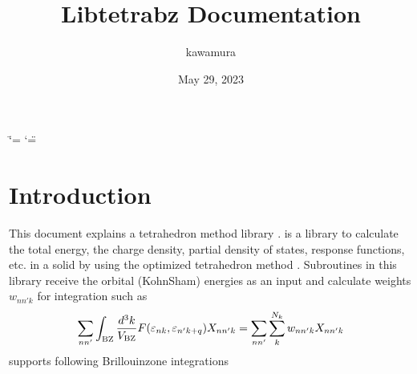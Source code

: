 \documentclass[letterpaper,10pt,pdftex,openany,english]{sphinxmanual}
\title{Libtetrabz Documentation}
\date{May 29, 2023}
\author{kawamura}
\begin{document}
\ifdefined\shorthandoff
  \ifnum\catcode`\=\string=\active\shorthandoff{=}\fi
  \ifnum\catcode`\"=\active{}\fi
\fi

\pagestyle{empty}
\sphinxmaketitle
\pagestyle{plain}
\sphinxtableofcontents
\pagestyle{normal}
\label{\detokenize{index::doc}}


\sphinxstepscope


\chapter{Introduction}
\label{\detokenize{overview:introduction}}\label{\detokenize{overview::doc}}
\sphinxAtStartPar
This document explains a tetrahedron method library .
 is a library to calculate the total energy, the charge
density, partial density of states, response functions, etc. in a solid
by using the optimized tetrahedron method {\hyperref[\detokenize{ref:ref}]{}}.
Subroutines in this library receive the orbital (Kohn\sphinxhyphen{}Sham) energies as an input and
calculate weights \(w_{n n' k}\) for integration such as
\begin{equation*}
\begin{split}\begin{align}
\sum_{n n'}
\int_{\rm BZ} \frac{d^3 k}{V_{\rm BZ}}
F(\varepsilon_{n k}, \varepsilon_{n' k+q})X_{n n' k}
= \sum_{n n'} \sum_{k}^{N_k} w_{n n' k} X_{n n' k}
\end{align}\end{split}
\end{equation*}
\sphinxAtStartPar
{} supports following Brillouin\sphinxhyphen{}zone integrations
\end{document}
